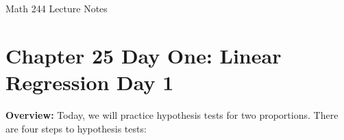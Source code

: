 \documentclass[12pt]{amsart}
\date{}
\theoremstyle{definition}
\begin{document}
\newcommand{\ph}{\phantom}
\newcommand{\ds}{\displaystyle}

\renewcommand{\emph}{\textbf}
\onehalfspace


\fancyhf{}   %
\renewcommand{\headrulewidth}{0.4pt} %
\fancyfootoffset[LE,LO]{0in}        %
\renewcommand{\footrulewidth}{0.4pt} %




\begin{center}

	\larger[3]	Math 244 Lecture Notes \smaller[3]		\\[22pt]

\end{center}

\section*{Chapter 25 Day One: Linear Regression Day 1}




 \noindent \textbf{Overview:} Today, we will practice hypothesis tests for two proportions. There are four steps to hypothesis tests:
\end{document}
